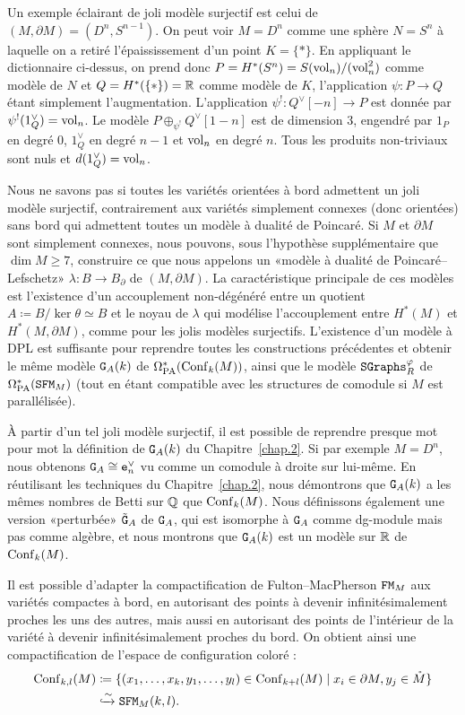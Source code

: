 Un exemple éclairant de joli modèle surjectif est celui de $(M, \partial M) = (D^{n}, S^{n-1})$.
On peut voir $M = D^{n}$ comme une sphère $N = S^{n}$ à laquelle on a retiré l'épaississement d'un point $K = \{*\}$.
En appliquant le dictionnaire ci-dessus, on prend donc $P = H^{*}(S^{n}) = S(\mathrm{vol}_{n})/(\mathrm{vol}_{n}^{2})$ comme modèle de $N$ et $Q = H^{*}(\{*\}) = \mathbb{R}$ comme modèle de $K$, l'application $\psi : P \to Q$ étant simplement l'augmentation.
L'application $\psi^{!} : Q^{\vee}[-n] \to P$ est donnée par $\psi^{!}(1_{Q}^{\vee}) = \mathrm{vol}_{n}$.
Le modèle $P \oplus_{\psi^{!}} Q^{\vee}[1-n]$ est de dimension $3$, engendré par $1_{P}$ en degré $0$, $1_{Q}^{\vee}$ en degré $n-1$ et $\mathrm{vol}_{n}$ en degré $n$.
Tous les produits non-triviaux sont nuls et $d(1_{Q}^{\vee}) = \mathrm{vol}_{n}$.

Nous ne savons pas si toutes les variétés orientées à bord admettent un joli modèle surjectif, contrairement aux variétés simplement connexes (donc orientées) sans bord qui admettent toutes un modèle à dualité de Poincaré.
Si $M$ et $\partial M$ sont simplement connexes, nous pouvons, sous l'hypothèse supplémentaire que $\dim M \geq 7$, construire ce que nous appelons un «modèle à dualité de Poincaré--Lefschetz» $\lambda : B \to B_{\partial}$ de $(M, \partial M)$.
La caractéristique principale de ces modèles est l'existence d'un accouplement non-dégénéré entre un quotient $A \coloneqq B/\ker \theta \simeq B$ et le noyau de $\lambda$ qui modélise l'accouplement entre $H^{*}(M)$ et $H^{*}(M, \partial M)$, comme pour les jolis modèles surjectifs.
L'existence d'un modèle à DPL est suffisante pour reprendre toutes les constructions précédentes et obtenir le même modèle $\mathtt{G}_{A}(k)$ de $\Omega_{\mathrm{PA}}^{*}(\operatorname{Conf}_{k}(M))$, ainsi que le modèle $\mathtt{SGraphs}_{R}^{\varphi}$ de $\Omega_{\mathrm{PA}}^{*}(\mathtt{SFM}_{M})$ (tout en étant compatible avec les structures de comodule si $M$ est parallélisée).

À partir d'un tel joli modèle surjectif, il est possible de reprendre presque mot pour mot la définition de $\mathtt{G}_{A}(k)$ du Chapitre~\ref{chap.2}.
Si par exemple $M = D^{n}$, nous obtenons $\mathtt{G}_{A} \cong \mathtt{e}_{n}^{\vee}$ vu comme un comodule à droite sur lui-même.
En réutilisant les techniques du Chapitre~\ref{chap.2}, nous démontrons que $\mathtt{G}_{A}(k)$ a les mêmes nombres de Betti sur $\mathbb{Q}$ que $\operatorname{Conf}_{k}(M)$.
Nous définissons également une version «perturbée» $\tilde{\mathtt{G}}_{A}$ de $\mathtt{G}_{A}$, qui est isomorphe à $\mathtt{G}_{A}$ comme dg-module mais pas comme algèbre, et nous montrons que $\mathtt{G}_{A}(k)$ est un modèle sur $\mathbb{R}$ de $\operatorname{Conf}_{k}(M)$.

Il est possible d'adapter la compactification de Fulton--MacPherson $\mathtt{FM}_{M}$ aux variétés compactes à bord, en autorisant des points à devenir infinitésimalement proches les uns des autres, mais aussi en autorisant des points de l'intérieur de la variété à devenir infinitésimalement proches du bord.
On obtient ainsi une compactification de l'espace de configuration coloré :
\begin{align*}
  \operatorname{Conf}_{k,l}(M)
  & \coloneqq \{ (x_{1}, \dots, x_{k}, y_{1}, \dots, y_{l}) \in \operatorname{Conf}_{k+l}(M) \mid x_{i} \in \partial M, y_{j} \in \mathring{M} \} \\
  & \xhookrightarrow{\sim} \mathtt{SFM}_{M}(k,l).
\end{align*}

